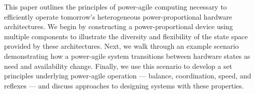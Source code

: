 This paper outlines the principles of power-agile computing necessary to
efficiently operate tomorrow's heterogeneous power-proportional hardware
architectures. We begin by constructing a power-proportional device using
multiple components to illustrate the diversity and flexibility of the state
space provided by these architectures. Next, we walk through an example
scenario demonstrating how a power-agile system transitions between hardware
states as need and availability change. Finally, we use this scenario to
develop a set principles underlying power-agile operation --- balance,
coordination, speed, and reflexes --- and discuss approaches to designing
systems with these properties.
